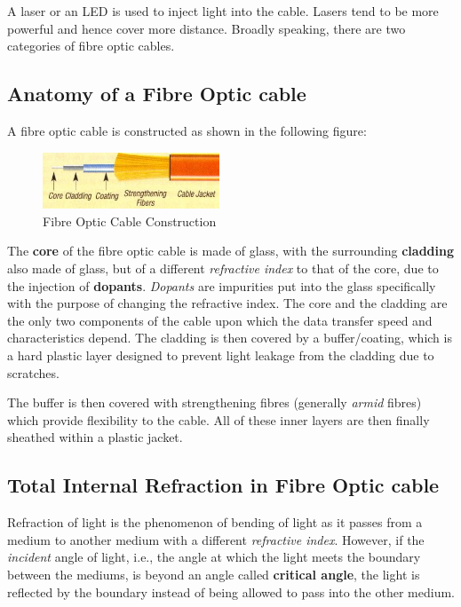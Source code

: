 A laser or an LED is used to inject light into the cable. Lasers tend to be more powerful and hence cover more distance. Broadly speaking, there are two categories of fibre optic cables.

\subsection{Anatomy of a Fibre Optic cable}
A fibre optic cable is constructed as shown in the following figure:

\begin{figure}
	\centering
	\vspace{-12pt}
	\includegraphics[width=0.47\textwidth]{"Mod1/chapters/1.4.c FibreConstruction"}
	\caption{\label{fig:coax_cable}Fibre Optic Cable Construction}
	\vspace{-10pt}
\end{figure}
\noindent
The \textbf{core} of the fibre optic cable is made of glass, with the surrounding \textbf{cladding} also made of glass, but of a different \textit{refractive index} to that of the core, due to the injection of \textbf{dopants}. \textit{Dopants} are impurities put into the glass specifically with the purpose of changing the refractive index. The core and the cladding are the only two components of the cable upon which the data transfer speed and characteristics depend. The cladding is then covered by a buffer/coating, which is a hard plastic layer designed to prevent light leakage from the cladding due to scratches. 

The buffer is then covered with strengthening fibres (generally \textit{armid} fibres) which provide flexibility to the cable. All of these inner layers are then finally sheathed within a plastic jacket. 

\subsection{Total Internal Refraction in Fibre Optic cable}
Refraction of light is the phenomenon of bending of light as it passes from a medium to another medium with a different \textit{refractive index}. However, if the \textit{incident} angle of light, i.e., the angle at which the light meets the boundary between the mediums, is beyond an angle called \textbf{critical angle}, the light is reflected by the boundary instead of being allowed to pass into the other medium. 

